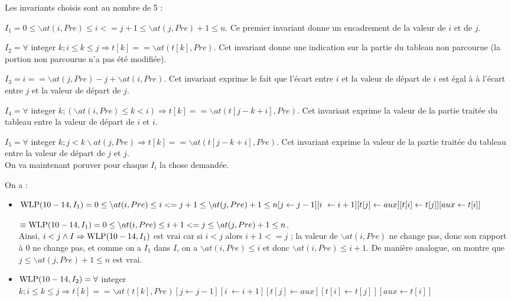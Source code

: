 \documentclass[11pt,answers]{exam}
\begin{document}
\begin{questions}
\begin{parts}
    \begin{solutionorbox}
        Les invariants choisis sont au nombre de 5 :

        $I_1 =  0 \leq \backslash at(i, Pre) \leq i<=j+1 \leq \backslash at(j, Pre)+1 \leq n$. Ce premier invariant donne
            un encadrement de la valeur de $i$ et de $j$.

        $I_2 = \forall$ integer $k; i \leq k \leq j \Rightarrow t[k] == \backslash at(t[k], Pre)$. Cet invariant donne
            une indication sur la partie du tableau non parcourue (la portion non parcourue n'a pas été modifiée).

        $I_3 = i == \backslash at(j, Pre) -j  + \backslash at(i, Pre)$. Cet invariant exprime le fait que l'écart entre $i$
            et la valeur de départ de $i$ est égal à à l'écart entre $j$ et la valeur de départ de $j$.

        $I_4 = \forall$ integer $k; (\backslash at(i, Pre) \leq k<i) \Rightarrow t[k] == \backslash at(t[j- k + i], Pre)$.
            Cet invariant exprime la valeur de la partie traitée du tableau entre la valeur de départ de $i$ et $i$.

        $I_5 = \forall$ integer $k; j<k\backslash at(j, Pre) \Rightarrow t[k] == \backslash at(t[j- k + i], Pre)$.
            Cet invariant exprime la valeur de la partie traitée du tableau entre la valeur de départ de $j$ et $j$. \\

        On va maintenant poruver pour chaque $I_i$ la chose demandée.

        On a : 

        \begin{itemize}
            \item $\mathrm{WLP}(10-14,I_1) = 0 \leq \backslash at(i, Pre) \leq i<=j+1 \leq \backslash at(j, Pre)+1 \leq n [j \leftarrow j-1][i \ \leftarrow i+1][t[j] \leftarrow aux][t[i] \leftarrow t[j]][aux \leftarrow t[i]]$
                  
                    $\equiv \mathrm{WLP}(10-14,I_1) =  0 \leq \backslash at(i, Pre) \leq i+1<=j \leq \backslash at(j, Pre)+1 \leq n $. \\

                  Ainsi,  $i < j \land I \Rightarrow \mathrm{WLP}(10-14,I_1)$ est vrai car si $i < j$ alors $i+1<=j$ ; la valeur de $\backslash at(i, Pre)$ ne change pas, donc son rapport à 0 ne change pas, et comme on a $I_1$ dans $I$, on a $\backslash at(i, Pre) \leq i$ et donc $\backslash at(i, Pre) \leq i+1$. De manière analogue, on montre que $j \leq \backslash at(j, Pre)+1 \leq n $ est vrai.
            \item $\mathrm{WLP}(10-14,I_2) =\forall$ integer $k; i \leq k \leq j \Rightarrow t[k] == \backslash at(t[k], Pre)[j \leftarrow j-1][i \ \leftarrow i+1][t[j] \leftarrow aux][t[i] \leftarrow t[j]][aux \leftarrow t[i]]$
                  

\end{itemize}
\end{solutionorbox}
\end{parts}
\end{questions}
\end{document}
